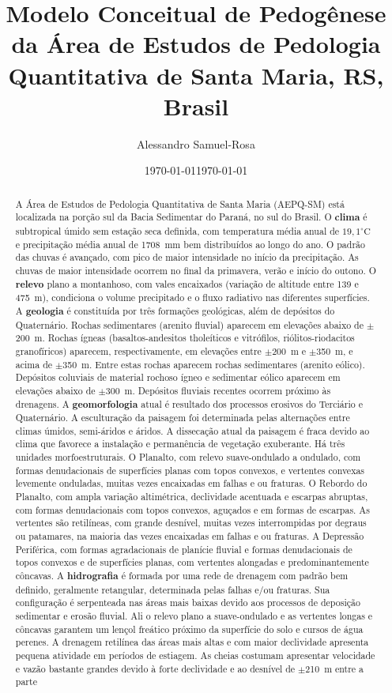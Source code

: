 \documentclass[final]{article}
\title{Modelo Conceitual de Pedogênese da Área de Estudos de Pedologia Quantitativa de Santa Maria, RS, Brasil}
\author{Alessandro Samuel-Rosa}
\date{\footnotesize \today}
\date{\today}
\begin{document}
\maketitle

\begin{abstract}
  A Área de Estudos de Pedologia Quantitativa de Santa Maria (AEPQ-SM) está localizada na porção sul da Bacia Sedimentar do Paraná, no sul do Brasil. O \textbf{clima} é subtropical úmido sem estação seca definida, com temperatura média anual de $19,1^\circ\text{C}$ e precipitação média anual de 1708~mm bem distribuídos ao longo do ano. O padrão das chuvas é avançado, com pico de maior intensidade no início da precipitação. As chuvas de maior intensidade ocorrem no final da primavera, verão e início do outono. O \textbf{relevo} plano a montanhoso, com vales encaixados (variação de altitude entre 139 e 475~m), condiciona o volume precipitado e o fluxo radiativo nas diferentes superfícies. A \textbf{geologia} é constituída por três formações geológicas, além de depósitos do Quaternário. Rochas sedimentares (arenito fluvial) aparecem em elevações abaixo de $\pm$200~m. Rochas ígneas (basaltos-andesitos tholeíticos e vitrófilos, riólitos-riodacitos granofíricos) aparecem, respectivamente, em elevações entre $\pm$200~m e $\pm$350~m, e acima de $\pm$350~m. Entre estas rochas aparecem rochas sedimentares (arenito eólico). Depósitos coluviais de material rochoso ígneo e sedimentar eólico aparecem em elevações abaixo de $\pm$300~m. Depósitos fluviais recentes ocorrem próximo às drenagens. A \textbf{geomorfologia} atual é resultado dos processos erosivos do Terciário e Quaternário. A esculturação da paisagem foi determinada pelas alternações entre climas úmidos, semi-áridos e áridos. A dissecação atual da paisagem é fraca devido ao clima que favorece a instalação e permanência de vegetação exuberante. Há três unidades morfoestruturais. O Planalto, com relevo suave-ondulado a ondulado, com formas denudacionais de superfícies planas com topos convexos, e vertentes convexas levemente onduladas, muitas vezes encaixadas em falhas e ou fraturas. O Rebordo do Planalto, com ampla variação altimétrica, declividade acentuada e escarpas abruptas, com formas denudacionais com topos convexos, aguçados e em formas de escarpas. As vertentes são retilíneas, com grande desnível, muitas vezes interrompidas por degraus ou patamares, na maioria das vezes encaixadas em falhas e ou fraturas. A Depressão Periférica, com formas agradacionais de planície fluvial e formas denudacionais de topos convexos e de superfícies planas, com vertentes alongadas e predominantemente côncavas. A \textbf{hidrografia} é formada por uma rede de drenagem com padrão bem definido, geralmente retangular, determinada pelas falhas e/ou fraturas. Sua configuração é serpenteada nas áreas mais baixas devido aos processos de deposição sedimentar e erosão fluvial. Ali o relevo plano a suave-ondulado e as vertentes longas e côncavas garantem um lençol freático próximo da superfície do solo e cursos de água perenes. A drenagem retilínea das áreas mais altas e com maior declividade apresenta pequena atividade em períodos de estiagem. As cheias costumam apresentar velocidade e vazão bastante grandes devido à forte declividade e ao desnível de $\pm$210~m entre a parte 
\end{abstract}
\end{document}
